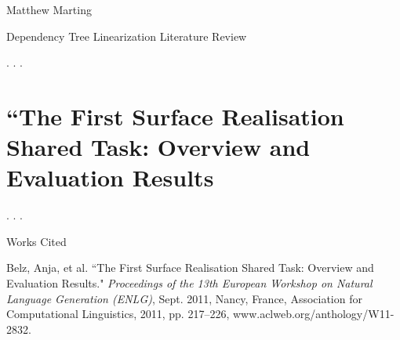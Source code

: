 \documentclass[12pt,letterpaper]{article}
\def \mylastname {Marting}
\def \myname {Matthew \mylastname{}}
\newenvironment{workscited}{
  \newcommand\bibentry{\noindent\hangindent=0.5in}
  \newpage{}
  \begin{center}
    Works Cited
  \end{center}
}{\newpage{}}
\begin{document}
\begin{flushleft}
  \myname{}\\
  {\centering Dependency Tree Linearization Literature Review\par{}}
  \setlength{\parindent}{0.5in}
  . . .
  \section*{``The First Surface Realisation Shared Task: Overview and Evaluation Results}
  . . .
  \begin{workscited}
    \bibentry{}Belz, Anja, et al. ``The First Surface Realisation Shared Task: Overview and Evaluation Results." \textit{Proceedings of the 13th European Workshop on Natural Language Generation (ENLG)}, Sept. 2011, Nancy, France, Association for Computational Linguistics, 2011, pp. 217--226, www.aclweb.org/anthology/W11-2832.
  \end{workscited}
\end{flushleft}
\end{document}
